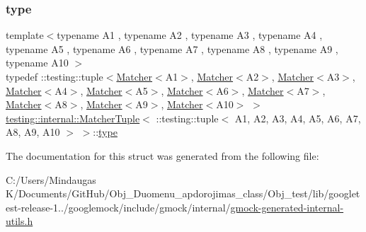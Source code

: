 \subsubsection{\texorpdfstring{type}{type}}
{\footnotesize\ttfamily template$<$typename A1 , typename A2 , typename A3 , typename A4 , typename A5 , typename A6 , typename A7 , typename A8 , typename A9 , typename A10 $>$ \\
typedef \+::testing\+::tuple$<$\mbox{\hyperlink{classtesting_1_1_matcher}{Matcher}}$<$A1$>$, \mbox{\hyperlink{classtesting_1_1_matcher}{Matcher}}$<$A2$>$, \mbox{\hyperlink{classtesting_1_1_matcher}{Matcher}}$<$A3$>$, \mbox{\hyperlink{classtesting_1_1_matcher}{Matcher}}$<$A4$>$, \mbox{\hyperlink{classtesting_1_1_matcher}{Matcher}}$<$A5$>$, \mbox{\hyperlink{classtesting_1_1_matcher}{Matcher}}$<$A6$>$, \mbox{\hyperlink{classtesting_1_1_matcher}{Matcher}}$<$A7$>$, \mbox{\hyperlink{classtesting_1_1_matcher}{Matcher}}$<$A8$>$, \mbox{\hyperlink{classtesting_1_1_matcher}{Matcher}}$<$A9$>$, \mbox{\hyperlink{classtesting_1_1_matcher}{Matcher}}$<$A10$>$ $>$ \mbox{\hyperlink{structtesting_1_1internal_1_1_matcher_tuple}{testing\+::internal\+::\+Matcher\+Tuple}}$<$ \+::testing\+::tuple$<$ A1, A2, A3, A4, A5, A6, A7, A8, A9, A10 $>$ $>$\+::\mbox{\hyperlink{structtesting_1_1internal_1_1_matcher_tuple_3_01_1_1testing_1_1tuple_3_01_a1_00_01_a2_00_01_a3_0842d32b3c1d00aa4e42fe38fbc4fa689_ad8f6e383d160062fe6ccf40a839fdd31}{type}}}



The documentation for this struct was generated from the following file\+:\begin{DoxyCompactItemize}
\item 
C\+:/\+Users/\+Mindaugas K/\+Documents/\+Git\+Hub/\+Obj\+\_\+\+Duomenu\+\_\+apdorojimas\+\_\+class/\+Obj\+\_\+test/lib/googletest-\/release-\/1../googlemock/include/gmock/internal/\mbox{\hyperlink{gmock-generated-internal-utils_8h}{gmock-\/generated-\/internal-\/utils.\+h}}\end{DoxyCompactItemize}
